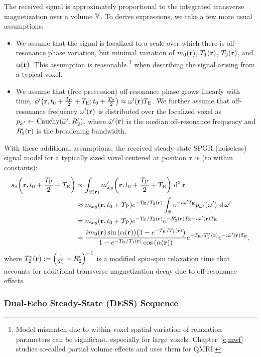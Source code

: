 The received signal
is approximately proportional 
to the integrated transverse magnetization
over a volume $\mathbb{V}$.
To derive expressions,
we take a few more usual assumptions:
\begin{itemize}
	\item We assume that
	the signal is localized
	to a scale over which
	there is off-resonance phase variation,
	but minimal variation
	of $\mzero\pr$, $\To\pr$, $\Tt\pr$, and $\flip\pr$.
	This assumption is reasonable
	\footnote{Model mismatch due
		to within-voxel spatial variation 
		of relaxation parameters
		can be significant,
		especially for large voxels.
		Chapter~\ref{c,mwf} studies 
		so-called partial volume effects
		and uses them for QMRI.
	} 
	when describing the signal 
	arising from a typical voxel.
	\item We assume that
	(free-precession) off-resonance phase 
	grows linearly with time,
	\ie $\php\paren{\bmr,t_0+\frac{\TP}{2}+\TE;t_0+\frac{\TP}{2}} \approx \omp\pr \TE$.
	We further assume
	that off-resonance frequency $\omp\pr$
	is distributed over the localized voxel
	as $\dist{\omp} \gets \operatorname{Cauchy}\paren{\ompmed,\Rtp}$,
	where $\ompmed\pr$ is the median off-resonance frequency
	and $\Rtp\pr$ is the broadening bandwidth.
\end{itemize}
With these additional assumptions,
the received steady-state SPGR (noiseless) signal model
for a typically sized voxel
centered at position $\mathbf{r}$ is (to within constants):
\begin{align}
	\spgr\paren{\bmr,t_0+\frac{\TP}{2}+\TE} 
	&\propto \int_{\setv\pr} \mxyp\paren{\bmr,t_0+\frac{\TP}{2}+\TE} \dercubed{\bmr} 
		\label{eq:spgr-int} \\
	&\approx \mxy\paren{\bmr,t_0+\TP} e^{-\TE/\Tt\pr} \int_\real e^{-i\omp \TE} 
		\dist{\omp}\paren{\omp} \der{\omp} \nonumber \\
	&= \mxy\paren{\bmr,t_0+\TP} e^{-\TE/\Tt\pr} e^{-\Rtp\pr\TE - i\ompmed\pr\TE} \nonumber \\
	&= \frac{i\mzero\pr \sina{\flip\pr} \paren{1-e^{-\TR/\To\pr}}}
	{1-e^{-\TR/\To\pr}\cosa{\alpha\pr}} e^{-\TE/\Tts\pr} e^{-i\ompmed\pr \TE},
		\label{eq:spgr-model}
\end{align}
where $\Tts\pr := \inv{\frac{1}{\Tt} + \Rtp}$
is a modified spin-spin relaxation time
that accounts for additional transverse magnetization decay
due to off-resonance effects.

\subsubsection{Dual-Echo Steady-State (DESS) Sequence}
\label{sss,bkgrd,mri,ss,dess}

